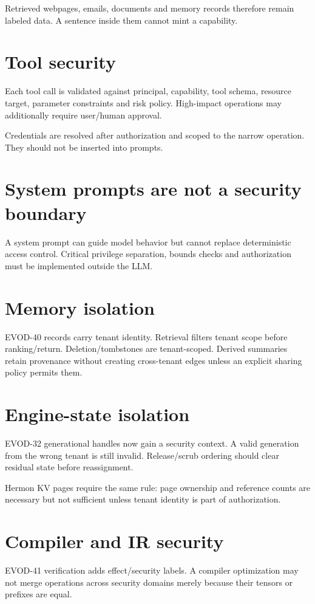
Retrieved webpages, emails, documents and memory records therefore remain labeled data. A sentence inside them cannot mint a capability.

\section{Tool security}
Each tool call is validated against principal, capability, tool schema, resource target, parameter constraints and risk policy. High-impact operations may additionally require user/human approval.

Credentials are resolved after authorization and scoped to the narrow operation. They should not be inserted into prompts.

\section{System prompts are not a security boundary}
A system prompt can guide model behavior but cannot replace deterministic access control. Critical privilege separation, bounds checks and authorization must be implemented outside the LLM.

\section{Memory isolation}
EVOD-40 records carry tenant identity. Retrieval filters tenant scope before ranking/return. Deletion/tombstones are tenant-scoped. Derived summaries retain provenance without creating cross-tenant edges unless an explicit sharing policy permits them.

\section{Engine-state isolation}
EVOD-32 generational handles now gain a security context. A valid generation from the wrong tenant is still invalid. Release/scrub ordering should clear residual state before reassignment.

Hermon KV pages require the same rule: page ownership and reference counts are necessary but not sufficient unless tenant identity is part of authorization.

\section{Compiler and IR security}
EVOD-41 verification adds effect/security labels. A compiler optimization may not merge operations across security domains merely because their tensors or prefixes are equal.

